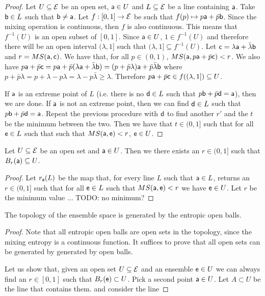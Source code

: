 \begin{proof}
	Let $U \subseteq \Ens$ be an open set, $\ens[a] \in U$ and $L \subseteq \Ens$ be a line containing $\ens[a]$. Take $\ens[b] \in L$ such that $\ens[b] \neq \ens[a]$. Let $f : [0,1] \to \Ens$ be such that $f(p) \mapsto p \ens[a] + \bar{p} \ens[b]$. Since the mixing operation is continuous, then $f$ is also continuous. This means that $f^{-1}(U)$ is an open subset of $[0,1]$. Since $\ens[a] \in U$, $1 \in f^{-1}(U)$ and therefore there will be an open interval $(\lambda, 1]$ such that $(\lambda, 1] \subseteq f^{-1}(U)$. Let $\ens[c] = \lambda \ens[a] + \bar{\lambda} \ens[b]$ and $r = MS(\ens[a], \ens[c])$. We have that, for all $p \in (0,1)$, $MS(\ens[a], p\ens[a] +\bar{p}\ens[c])<r$. We also have $p\ens[a] +\bar{p}\ens[c] = p\ens[a] +\bar{p}(\lambda \ens[a] + \bar{\lambda} \ens[b]) = (p + \bar{p}\lambda)\ens[a] + \bar{p}\bar{\lambda}\ens[b]$ where $p + \bar{p}\lambda = p + \lambda - p\lambda = \lambda - p\bar{\lambda} \geq \lambda$. Therefore $p\ens[a] +\bar{p}\ens[c] \in f((\lambda,1]) \subseteq U$.
	
	If $\ens[a]$ is an extreme point of $L$ (i.e. there is no $\ens[d] \in L$ such that $p\ens[b] + \bar{p}\ens[d] = \ens[a]$), then we are done. If $\ens[a]$ is not an extreme point, then we can find $\ens[d] \in L$ such that $p\ens[b] + \bar{p}\ens[d] = \ens[a]$. Repeat the previous procedure with $\ens[d]$ to find another $r'$ and the $t$ be the minimum between the two. Then we have that $t \in (0,1]$ such that for all $\ens \in L$ such that such that $MS(\ens[a], \ens) < r$, $\ens \in U$.
\end{proof}

\begin{prop}
	Let $U \subseteq \Ens$ be an open set and $\ens[a] \in U$. Then we there exists an $r \in (0,1]$ such that $B_r(\ens[a]) \subseteq U$.
\end{prop}

\begin{proof}
	Let $r_{\ens[a]}(L)$ be the map that, for every line $L$ such that $\ens[a] \in L$, returns an $r \in (0,1]$ such that for all $\ens \in L$ such that $MS(\ens[a], \ens) < r$ we have $\ens \in U$. Let $r$ be the minimum value ... TODO: no minimum?
\end{proof}

\begin{prop}
	The topology of the ensemble space is generated by the entropic open balls.
\end{prop}

\begin{proof}
	Note that all entropic open balls are open sets in the topology, since the mixing entropy is a continuous function. It suffices to prove that all open sets can be generated by generated by open balls.
	
	Let us show that, given an open set $U \subseteq \Ens$ and an ensemble $\ens \in U$ we can always find an $r \in [0,1]$ such that $B_r(\ens) \subset U$. Pick a second point $\ens[a] \in U$. Let $A \subset U$ be the line that contains them.  and consider the line 
\end{proof}

